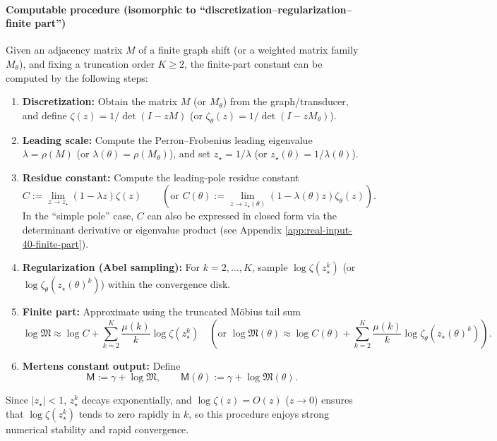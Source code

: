 \paragraph{Computable procedure (isomorphic to ``discretization--regularization--finite part'')}
Given an adjacency matrix $M$ of a finite graph shift (or a weighted matrix family $M_\theta$), and fixing a truncation order $K\ge 2$, the finite-part constant can be computed by the following steps:
\begin{enumerate}
  \item \textbf{Discretization:} Obtain the matrix $M$ (or $M_\theta$) from the graph/transducer, and define $\zeta(z)=1/\det(I-zM)$ (or $\zeta_\theta(z)=1/\det(I-zM_\theta)$).
  \item \textbf{Leading scale:} Compute the Perron--Frobenius leading eigenvalue $\lambda=\rho(M)$ (or $\lambda(\theta)=\rho(M_\theta)$), and set $z_\star=1/\lambda$ (or $z_\star(\theta)=1/\lambda(\theta)$).
  \item \textbf{Residue constant:} Compute the leading-pole residue constant
  \[
  C:=\lim_{z\to z_\star}(1-\lambda z)\zeta(z)
  \qquad
  (\text{or }C(\theta):=\lim_{z\to z_\star(\theta)}(1-\lambda(\theta)z)\zeta_\theta(z)).
  \]
  In the ``simple pole'' case, $C$ can also be expressed in closed form via the determinant derivative or eigenvalue product (see Appendix \ref{app:real-input-40-finite-part}).
  \item \textbf{Regularization (Abel sampling):} For $k=2,\dots,K$, sample $\log\zeta(z_\star^k)$ (or $\log\zeta_\theta(z_\star(\theta)^k)$) within the convergence disk.
  \item \textbf{Finite part:} Approximate using the truncated M\"{o}bius tail sum
  \[
  \log\mathfrak{M}\approx \log C+\sum_{k=2}^{K}\frac{\mu(k)}{k}\log\zeta(z_\star^k)
  \quad
  (\text{or }\log\mathfrak{M}(\theta)\approx \log C(\theta)+\sum_{k=2}^{K}\frac{\mu(k)}{k}\log\zeta_\theta(z_\star(\theta)^k)).
  \]
  \item \textbf{Mertens constant output:} Define
  \[
  \mathsf{M}:=\gamma+\log\mathfrak{M},
  \qquad
  \mathsf{M}(\theta):=\gamma+\log\mathfrak{M}(\theta).
  \]
\end{enumerate}
Since $|z_\star|<1$, $z_\star^k$ decays exponentially, and $\log\zeta(z)=O(z)$ ($z\to 0$) ensures that $\log\zeta(z_\star^k)$ tends to zero rapidly in $k$, so this procedure enjoys strong numerical stability and rapid convergence.

